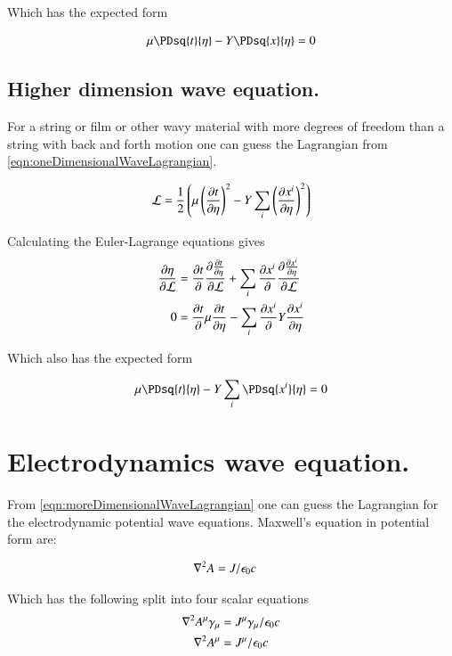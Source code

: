 \documentclass{article}
\begin{document}
Which has the expected form

\begin{align*}
\mu \PDsq{t}{\eta} - Y \PDsq{x}{\eta} &= 0 \\
\end{align*}

\subsection{ Higher dimension wave equation. }

For a string or film or other wavy material with more degrees of freedom than a string with back and forth motion one can guess the Lagrangian from \ref{eqn:oneDimensionalWaveLagrangian}.

\begin{align}\label{eqn:moreDimensionalWaveLagrangian}
\mathcal{L} = \frac{1}{2} \left(\mu \left(\frac{\partial{t}}{\partial {\eta}}\right)^2 - Y \sum_i \left(\frac{\partial{x^i}}{\partial {\eta}}\right)^2 \right)
\end{align}

Calculating the Euler-Lagrange equations gives
\begin{align*}
\frac{\partial{\eta}}{\partial {\mathcal{L}}} &= \frac{\partial{t}}{\partial {}} \frac{\partial{ \frac{\partial{t}}{\partial {\eta}} }}{\partial {\mathcal{L}}} +\sum_i \frac{\partial{x^i}}{\partial {}} \frac{\partial{ \frac{\partial{x^i}}{\partial {\eta}} }}{\partial {\mathcal{L}}} \\
0 &= \frac{\partial{t}}{\partial {}} \mu \frac{\partial{t}}{\partial {\eta}} - \sum_i \frac{\partial{x^i}}{\partial {}} Y \frac{\partial{x^i}}{\partial {\eta}} \\
\end{align*}

Which also has the expected form

\begin{align*}
\mu \PDsq{t}{\eta} - Y \sum_i \PDsq{x^i}{\eta} &= 0 \\
\end{align*}

\section{ Electrodynamics wave equation. }

From \ref{eqn:moreDimensionalWaveLagrangian} one can guess the Lagrangian for the electrodynamic potential wave equations.  Maxwell's equation in potential form are:

\begin{align}\label{eqn:maxwellPotential}
\nabla^2 A &= J/\epsilon_0 c
\end{align}

Which has the following split into four scalar equations
\begin{align*}
\nabla^2 A^\mu \gamma_\mu &= J^\mu \gamma_\mu/\epsilon_0 c \\
\nabla^2 A^\mu &= J^\mu /\epsilon_0 c
\end{align*}
\end{document}
